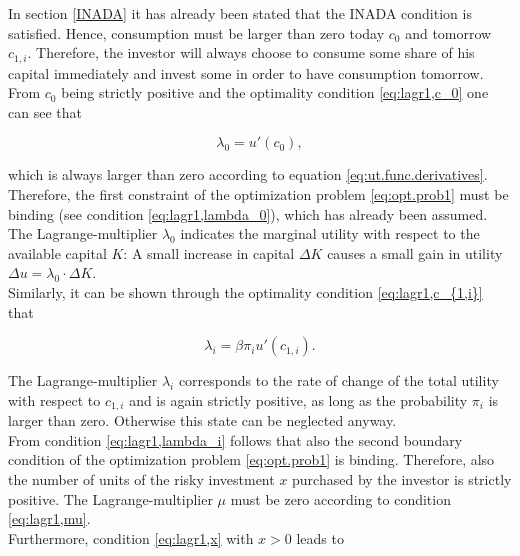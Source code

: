 \bigskip
\bigskip

\noindent In section \ref{INADA} it has already been stated that the INADA condition is satisfied. Hence, consumption must be larger than zero today $c_0$ and tomorrow $c_{1,i}$. Therefore, the investor will always choose to consume some share of his capital immediately and invest some in order to have consumption tomorrow. \\

\noindent From $c_0$ being strictly positive and the optimality condition \eqref{eq:lagr1,c_0} one can see that 

\begin{equation}\label{eq:opt.cond.lambda_0}
    \lambda_0 = u'(c_0),
\end{equation}

\bigskip

\noindent which is always larger than zero according to equation \eqref{eq:ut.func.derivatives}. Therefore, the first constraint of the optimization problem \eqref{eq:opt.prob1} must be binding (see condition \eqref{eq:lagr1,lambda_0}), which has already been assumed. \\
The Lagrange-multiplier $\lambda_0$ indicates the marginal utility with respect to the available capital $K$: A small increase in capital $\Delta K$ causes a small gain in utility $\Delta u = \lambda_0 \cdot \Delta K$.\\

\noindent Similarly, it can be shown through the optimality condition \eqref{eq:lagr1,c_{1,i}} that

\begin{equation}\label{eq:opt.cond.lambda_i}
    \lambda_i = \beta \pi_i u'(c_{1,i}).
\end{equation}

\bigskip

\noindent The Lagrange-multiplier $\lambda_i$ corresponds to the rate of change of the total utility with respect to $c_{1,i}$ and is again strictly positive, as long as the probability $\pi_i$ is larger than zero. Otherwise this state can be neglected anyway. \\
From condition \eqref{eq:lagr1,lambda_i} follows that also the second boundary condition of the optimization problem \eqref{eq:opt.prob1} is binding. Therefore, also the number of units of the risky investment $x$ purchased by the investor is strictly positive. The Lagrange-multiplier $\mu$ must be zero according to condition \eqref{eq:lagr1,mu}.\\
Furthermore, condition \eqref{eq:lagr1,x} with $x > 0$ leads to

